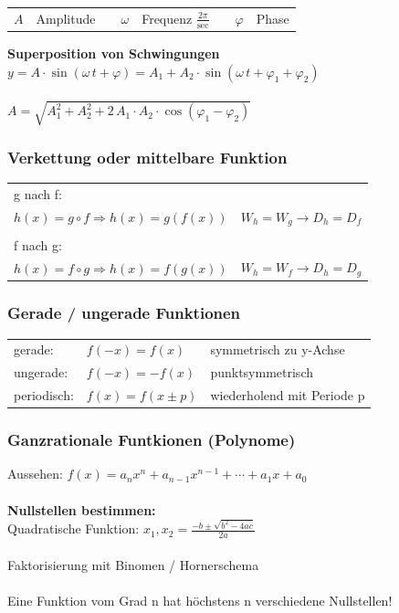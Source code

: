			\begin{tabular}{llllllll}
				$A$ & Amplitude & & $\omega$ & Frequenz $\frac{2 \pi}{\mathrm{sec}}$ & & $\varphi$ & Phase \\
			\end{tabular}			
			
			\textbf{Superposition von Schwingungen} \\
			$y = A \cdot \sin(\omega \, t + \varphi)  =  A_1 + A_2 \cdot \sin(\omega \, t + \varphi_1 + \varphi_2)$\\ 
			\\
			$A = \sqrt{A_1^2 + A_2^2 + 2 \,A_1 \cdot A_2 \cdot \cos(\varphi_1 - \varphi_2)}$
			
		\subsubsection{Verkettung oder mittelbare Funktion}
			\begin{tabular}{ll} %
				g nach f: & \\
				$h(x)=g \circ f \Rightarrow h(x)=g(f(x))$ & $W_h=W_g \rightarrow D_h=D_f$ \\
				\\
				f nach g: \\
				$h(x)=f \circ g \Rightarrow h(x)=f(g(x))$ & $W_h=W_f \rightarrow D_h=D_g$ \\				
			\end{tabular}
			
		\subsubsection{Gerade / ungerade Funktionen}
			\begin{tabular}{lll} 
				 gerade:     & $f(-x) = f(x)$      & symmetrisch zu y-Achse \\
				 ungerade:   & $f(-x) = -f(x)$     & punktsymmetrisch \\
				 periodisch: & $f(x) = f(x \pm p)$ & wiederholend mit Periode p \\								
			\end{tabular}			
				
		\subsubsection{Ganzrationale Funtkionen (Polynome)}
			Aussehen: $f(x)=a_nx^{n}+a_{n-1}x^{n-1}+\cdots+a_1x+a_0$\\
			\\
			\textbf{Nullstellen bestimmen:} \\
			Quadratische Funktion: $x_1 , x_2 = \frac{-b \pm \sqrt{b^2 - 4ac}}{2a}$ \\
			\\
			Faktorisierung mit Binomen / Hornerschema \\
			\\
			Eine Funktion vom Grad n hat höchstens n verschiedene Nullstellen!
			
